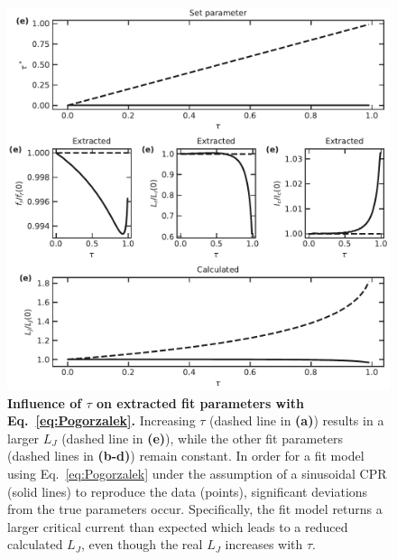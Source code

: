 \begin{figure}
	\centering
	\includegraphics[width=\linewidth]{chapter-gJJ-CPR/figs/SMFigure-tauparams}
	\caption{
		\textbf{Influence of $\tau$ on extracted fit parameters with Eq.~\ref{eq:Pogorzalek}.}
		Increasing $\tau$ (dashed line in \textbf{(a)}) results in a larger $L_J$ (dashed line in \textbf{(e)}), while the other fit parameters (dashed lines in \textbf{(b-d)}) remain constant.
		In order for a fit model using Eq.~\ref{eq:Pogorzalek} under the assumption of a sinusoidal CPR (solid lines) to reproduce the data (points), significant deviations from the true parameters occur.
		Specifically, the fit model returns a larger critical current than expected which leads to a reduced calculated $L_J$, even though the real $L_J$ increases with $\tau$.
	}
	\label{fig:SMtau}
\end{figure}

